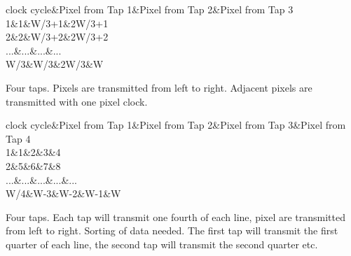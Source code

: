 \begin{Desc}
\begin{description}
\begin{TabularC}{4}
\hline
clock cycle&Pixel from Tap 1&Pixel from Tap 2&Pixel from Tap 3 \\
1&1&W/3+1&2\+W/3+1 \\
2&2&W/3+2&2\+W/3+2 \\
...&...&...&... \\
W/3&W/3&2\+W/3&W \\
\end{TabularC}
\item[{\em 
\hypertarget{group___device_specific_interface_gga25ba65893f1ee0e7de99cb51bb858d99a7cdb26b8a16da3fe9821144ae5d203cf}{cltxg1\+X4}\label{group___device_specific_interface_gga25ba65893f1ee0e7de99cb51bb858d99a7cdb26b8a16da3fe9821144ae5d203cf}
}]Four taps. Pixels are transmitted from left to right. Adjacent pixels are transmitted with one pixel clock.

\begin{TabularC}{5}
\hline
clock cycle&Pixel from Tap 1&Pixel from Tap 2&Pixel from Tap 3&Pixel from Tap 4 \\
1&1&2&3&4 \\
2&5&6&7&8 \\
...&...&...&...&... \\
W/4&W-\/3&W-\/2&W-\/1&W \\
\end{TabularC}
\item[{\em 
\hypertarget{group___device_specific_interface_gga25ba65893f1ee0e7de99cb51bb858d99a0e63928cfb74829b2cfe63a3170a2319}{cltxg4\+X}\label{group___device_specific_interface_gga25ba65893f1ee0e7de99cb51bb858d99a0e63928cfb74829b2cfe63a3170a2319}
}]Four taps. Each tap will transmit one fourth of each line, pixel are transmitted from left to right. Sorting of data needed. The first tap will transmit the first quarter of each line, the second tap will transmit the second quarter etc.


\end{description}
\end{Desc}
